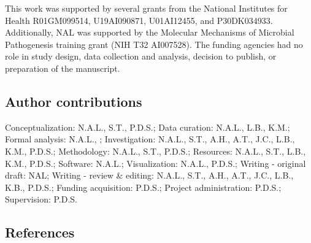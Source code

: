 \documentclass[
  12pt,
]{article}
\begin{document}
This work was supported by several grants from the National Institutes
for Health R01GM099514, U19AI090871, U01AI12455, and P30DK034933.
Additionally, NAL was supported by the Molecular Mechanisms of Microbial
Pathogenesis training grant (NIH T32 AI007528). The funding agencies had
no role in study design, data collection and analysis, decision to
publish, or preparation of the manuscript.

\hypertarget{author-contributions}{%
\subsection{Author contributions}\label{author-contributions}}

Conceptualization: N.A.L., S.T., P.D.S.; Data curation: N.A.L., L.B.,
K.M.; Formal analysis: N.A.L., ; Investigation: N.A.L., S.T., A.H.,
A.T., J.C., L.B., K.M., P.D.S.; Methodology: N.A.L., S.T., P.D.S.;
Resources: N.A.L., S.T., L.B., K.M., P.D.S.; Software: N.A.L.;
Visualization: N.A.L., P.D.S.; Writing - original draft: NAL; Writing -
review \& editing: N.A.L., S.T., A.H., A.T., J.C., L.B., K.B., P.D.S.;
Funding acquisition: P.D.S.; Project administration: P.D.S.;
Supervision: P.D.S.

\newpage

\hypertarget{references}{%
\subsection{References}\label{references}}
\end{document}
